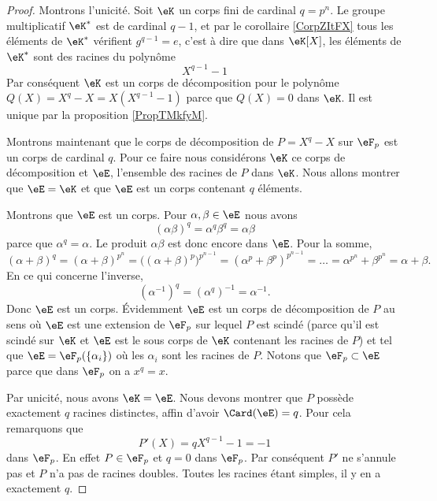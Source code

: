 \begin{proof}
    Montrons l'unicité. Soit \( \eK\) un corps fini de cardinal \( q=p^n\). Le groupe multiplicatif \( \eK^*\) est de cardinal \( q-1\), et par le corollaire \ref{CorpZItFX} tous les éléments de \( \eK^*\) vérifient \( g^{q-1}=e\), c'est à dire que dans \( \eK[X]\), les éléments de \( \eK^*\) sont des racines du polynôme
    \begin{equation}
        X^{q-1}-1
    \end{equation}
    Par conséquent \( \eK\) est un corps de décomposition pour le polynôme \( Q(X)=X^q-X=X(X^{q-1}-1)\) parce que \( Q(X)=0\) dans \( \eK\). Il est unique par la proposition \ref{PropTMkfyM}.

    Montrons maintenant que le corps de décomposition de \( P=X^q-X\) sur \( \eF_p\) est un corps de cardinal \( q\). Pour ce faire nous considérons \( \eK\) ce corps de décomposition et \(\eE\), l'ensemble des racines de \( P\) dans \( \eK\). Nous allons montrer que \( \eE=\eK\) et que \( \eE\) est un corps contenant \( q\) éléments.

    Montrons que \( \eE\) est un corps. Pour \( \alpha,\beta\in \eE\) nous avons
    \begin{equation}
        (\alpha\beta)^q=\alpha^q\beta^q=\alpha\beta
    \end{equation}
    parce que \( \alpha^q=\alpha\). Le produit \( \alpha\beta\) est donc encore dans \( \eE\). Pour la somme,
    \begin{equation}
        (\alpha+\beta)^q=(\alpha+\beta)^{p^n}=\Big( (\alpha+\beta)^p \Big)^{p^{n-1}}=(\alpha^p+\beta^p)^{p^{n-1}}=\ldots=\alpha^{p^n}+\beta^{p^n}=\alpha+\beta.
    \end{equation}
    En ce qui concerne l'inverse,
    \begin{equation}
        (\alpha^{-1})^q=(\alpha^q)^{-1}=\alpha^{-1}.
    \end{equation}
    Donc \( \eE\) est un corps. Évidemment \( \eE\) est un corps de décomposition de \( P\) au sens où \( \eE\) est une extension de \( \eF_p\) sur lequel \( P\) est scindé (parce qu'il est scindé sur \( \eK\) et \( \eE\) est le sous corps de \( \eK\) contenant les racines de \( P\)) et tel que \( \eE=\eF_p(\{ \alpha_i \})\) où les \( \alpha_i\) sont les racines de \( P\). Notons que \( \eF_p\subset \eE\) parce que dans \( \eF_p\) on a \( x^q=x\).

    Par unicité, nous avons \( \eK=\eE\). Nous devons montrer que \( P\) possède exactement \( q\) racines distinctes, affin d'avoir \( \Card(\eE)=q\). Pour cela remarquons que 
    \begin{equation}
        P'(X)=qX^{q-1}-1=-1
    \end{equation}
    dans \( \eF_p\). En effet \( P\in\eF_p\) et \( q=0\) dans \( \eF_p\). Par conséquent \( P'\) ne s'annule pas et \( P\) n'a pas de racines doubles. Toutes les racines étant simples, il y en a exactement \( q\).

\end{proof}

